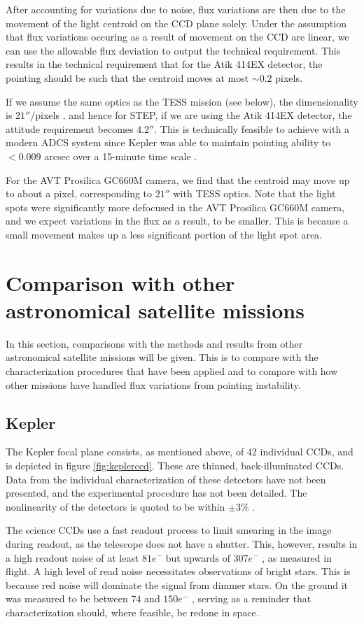 \documentclass[../main.tex]{subfiles}
\begin{document}
After accounting for variations due to noise, flux variations are then due to the movement of the light centroid on the CCD plane solely. Under the assumption that flux variations occuring as a result of movement on the CCD are linear, we can use the allowable flux deviation to output the technical requirement. This results in the technical requirement that for the Atik 414EX detector, the pointing should be such that the centroid moves at most $\sim 0.2$ pixels.

If we assume the same optics as the TESS mission (see below), the dimensionality is $21'' /$pixels \cite{tessinstrumenthandbook}, and hence for STEP, if we are using the Atik 414EX detector, the attitude requirement becomes $4.2''$. This is technically feasible to achieve with a modern ADCS system since Kepler was able to maintain pointing ability to $< 0.009$ arcsec over a 15-minute time scale \cite{2016ksci.rept....1V}. 

For the AVT Prosilica GC660M camera, we find that the centroid may move up to about a pixel, corresponding to $21''$ with TESS optics. Note that the light spots were significantly more defocused in the AVT Prosilica GC660M camera, and we expect variations in the flux as a result, to be smaller. This is because a small movement makes up a less significant portion of the light spot area.

\section{Comparison with other astronomical satellite missions}
In this section, comparisons with the methods and results from other astronomical satellite missions will be given. This is to compare with the characterization procedures that have been applied and to compare with how other missions have handled flux variations from pointing instability.

\subsection{Kepler}
The Kepler focal plane consists, as mentioned above, of 42 individual CCDs, and is depicted in figure \ref{fig:keplerccd}. These are thinned, back-illuminated CCDs. Data from the individual characterization of these detectors have not been presented, and the experimental procedure has not been detailed. The nonlinearity of the detectors is quoted to be within $\pm3\%$ \cite{2016ksci.rept....1V, hatp7}. 

The science CCDs use a fast readout process to limit smearing in the image during readout, as the telescope does not have a shutter. This, however, results in a high readout noise of at least $81 e^-$ but upwards of $307 e^-$ \cite{keplerperformance}, as measured in flight. A high level of read noise necessitates observations of bright stars. This is because red noise will dominate the signal from dimmer stars. On the ground it was measured to be between $74$ and $150 e^-$ \cite{2016ksci.rept....1V}, serving as a reminder that characterization should, where feasible, be redone in space.
\end{document}
